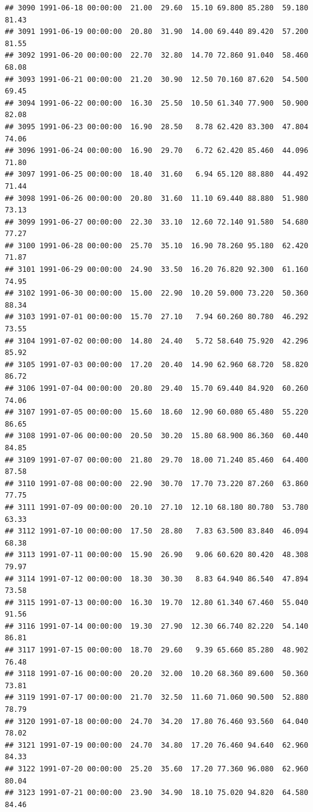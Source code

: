 \documentclass{article}\usepackage{graphicx, color}
\makeatletter
\newenvironment{kframe}{%
 \def\at@end@of@kframe{}%
 \ifinner\ifhmode%
  \def\at@end@of@kframe{\end{minipage}}%
  \begin{minipage}{\columnwidth}%
 \fi\fi%
 \def\FrameCommand##1{\hskip\@totalleftmargin \hskip-\fboxsep
 \colorbox{shadecolor}{##1}\hskip-\fboxsep
     \hskip-\linewidth \hskip-\@totalleftmargin \hskip\columnwidth}%
 \MakeFramed {\advance\hsize-\width
   \@totalleftmargin\z@ \linewidth\hsize
   \@setminipage}}%
 {\par\unskip\endMakeFramed%
 \at@end@of@kframe}
\newenvironment{knitrout}{}{} %
\makeatother
\begin{document}
\begin{knitrout}
\begin{kframe}
\begin{verbatim}
## 3090 1991-06-18 00:00:00  21.00  29.60  15.10 69.800 85.280  59.180  81.43
## 3091 1991-06-19 00:00:00  20.80  31.90  14.00 69.440 89.420  57.200  81.55
## 3092 1991-06-20 00:00:00  22.70  32.80  14.70 72.860 91.040  58.460  68.08
## 3093 1991-06-21 00:00:00  21.20  30.90  12.50 70.160 87.620  54.500  69.45
## 3094 1991-06-22 00:00:00  16.30  25.50  10.50 61.340 77.900  50.900  82.08
## 3095 1991-06-23 00:00:00  16.90  28.50   8.78 62.420 83.300  47.804  74.06
## 3096 1991-06-24 00:00:00  16.90  29.70   6.72 62.420 85.460  44.096  71.80
## 3097 1991-06-25 00:00:00  18.40  31.60   6.94 65.120 88.880  44.492  71.44
## 3098 1991-06-26 00:00:00  20.80  31.60  11.10 69.440 88.880  51.980  73.13
## 3099 1991-06-27 00:00:00  22.30  33.10  12.60 72.140 91.580  54.680  77.27
## 3100 1991-06-28 00:00:00  25.70  35.10  16.90 78.260 95.180  62.420  71.87
## 3101 1991-06-29 00:00:00  24.90  33.50  16.20 76.820 92.300  61.160  74.95
## 3102 1991-06-30 00:00:00  15.00  22.90  10.20 59.000 73.220  50.360  88.34
## 3103 1991-07-01 00:00:00  15.70  27.10   7.94 60.260 80.780  46.292  73.55
## 3104 1991-07-02 00:00:00  14.80  24.40   5.72 58.640 75.920  42.296  85.92
## 3105 1991-07-03 00:00:00  17.20  20.40  14.90 62.960 68.720  58.820  86.72
## 3106 1991-07-04 00:00:00  20.80  29.40  15.70 69.440 84.920  60.260  74.06
## 3107 1991-07-05 00:00:00  15.60  18.60  12.90 60.080 65.480  55.220  86.65
## 3108 1991-07-06 00:00:00  20.50  30.20  15.80 68.900 86.360  60.440  84.85
## 3109 1991-07-07 00:00:00  21.80  29.70  18.00 71.240 85.460  64.400  87.58
## 3110 1991-07-08 00:00:00  22.90  30.70  17.70 73.220 87.260  63.860  77.75
## 3111 1991-07-09 00:00:00  20.10  27.10  12.10 68.180 80.780  53.780  63.33
## 3112 1991-07-10 00:00:00  17.50  28.80   7.83 63.500 83.840  46.094  68.38
## 3113 1991-07-11 00:00:00  15.90  26.90   9.06 60.620 80.420  48.308  79.97
## 3114 1991-07-12 00:00:00  18.30  30.30   8.83 64.940 86.540  47.894  73.58
## 3115 1991-07-13 00:00:00  16.30  19.70  12.80 61.340 67.460  55.040  91.56
## 3116 1991-07-14 00:00:00  19.30  27.90  12.30 66.740 82.220  54.140  86.81
## 3117 1991-07-15 00:00:00  18.70  29.60   9.39 65.660 85.280  48.902  76.48
## 3118 1991-07-16 00:00:00  20.20  32.00  10.20 68.360 89.600  50.360  73.81
## 3119 1991-07-17 00:00:00  21.70  32.50  11.60 71.060 90.500  52.880  78.79
## 3120 1991-07-18 00:00:00  24.70  34.20  17.80 76.460 93.560  64.040  78.02
## 3121 1991-07-19 00:00:00  24.70  34.80  17.20 76.460 94.640  62.960  84.33
## 3122 1991-07-20 00:00:00  25.20  35.60  17.20 77.360 96.080  62.960  80.04
## 3123 1991-07-21 00:00:00  23.90  34.90  18.10 75.020 94.820  64.580  84.46

\end{verbatim}
\end{kframe}
\end{knitrout}
\end{document}
